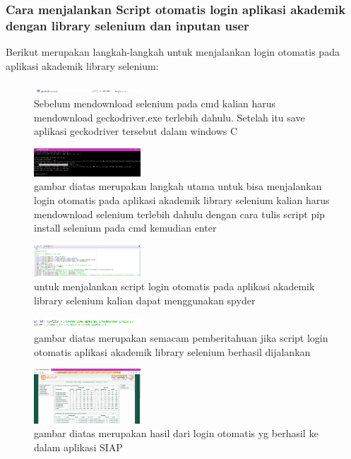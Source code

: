 \subsubsection{Cara menjalankan Script otomatis login aplikasi akademik dengan library selenium dan inputan user}
Berikut merupakan langkah-langkah untuk menjalankan login otomatis pada aplikasi akademik library selenium:
\begin{figure}[H]
		\includegraphics[width=4cm]{figures/1184065/Gecko.PNG}
		\centering
		\caption{Sebelum mendownload selenium pada cmd kalian harus mendownload geckodriver.exe terlebih dahulu. Setelah itu save aplikasi geckodriver tersebut dalam windows C }
	\end{figure}
\begin{figure}[H]
		\includegraphics[width=4cm]{figures/1184065/Selenium1.PNG}
		\centering
		\caption{gambar diatas merupakan langkah utama untuk bisa menjalankan login otomatis pada aplikasi akademik library selenium kalian harus mendownload selenium terlebih dahulu dengan cara tulis script pip install selenium pada cmd kemudian enter}
	\end{figure}
\begin{figure}[H]
		\includegraphics[width=4cm]{figures/1184065/KodingPenggunaOtomatis.PNG}
		\centering
		\caption{untuk menjalankan script login otomatis pada aplikasi akademik library selenium kalian dapat menggunakan spyder }
	\end{figure}
	\begin{figure}[H]
		\includegraphics[width=4cm]{figures/1184065/KeteranganLoginOtomatis.PNG}
		\centering
		\caption{gambar diatas merupakan semacam pemberitahuan jika script login otomatis aplikasi akademik library selenium berhasil dijalankan}
	\end{figure}
	\begin{figure}[H]
		\includegraphics[width=4cm]{figures/1184065/HasilLoginOtomatis.PNG}
		\centering
		\caption{gambar diatas merupakan hasil dari login otomatis yg berhasil ke dalam aplikasi SIAP }
	\end{figure}
